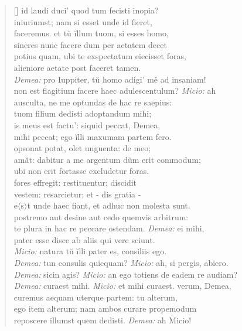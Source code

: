 \begin{verse}[\versewidth]
    id laudi duci' quod tum fecisti inopia?\\
    iniuriumst; nam si esset unde id fieret,\\
    faceremus. et tŭ ĭllum tuom, si esses homo,\\
    sineres nunc facere dum per aetatem decet\\
    potius quam, ubi te exspectatum eiecisset foras,\\
    alieniore aetate post faceret tamen.\\
    \textit{Demea:} pro Iuppiter, tŭ homo adigi' mě ad insaniam!\\
    non est flagitium facere haec adulescentulum? \textit{Micio:} ah\\
    ausculta, ne me optundas de hac re saepius:\\
    tuom filium dedisti adoptandum mihi;\\
    is meus est factu': siquid peccat, Demea,\\
    mihi peccat; ego ĭlli maxumam partem fero.\\
    opsonat potat, olet unguenta: de meo;\\
    amăt: dabitur a me argentum dŭm erit commodum;\\
    ubi non erit fortasse excludetur foras.\\
    fores effregit: restituentur; discidit\\
    vestem: resarcietur; et - dis gratia -\\
    e$\langle$s$\rangle$t unde haec fiant, et adhuc non molesta sunt.\\
    postremo aut desine aut cedo quemvis arbitrum:\\
    te plura in hac re peccare ostendam. \textit{Demea:} ei mihi,\\
    pater esse disce ab aliis qui vere sciunt.\\
    \textit{Micio:} natura tŭ ĭlli pater es, consiliis ego.\\
    \textit{Demea:} tun consulis quicquam? \textit{Micio:} ah, si pergis, abiero.\\
    \textit{Demea:} sicin agis? \textit{Micio:} an ego totiens de eadem re audiam?\\
    \textit{Demea:} curaest mihi. \textit{Micio:} et mihi curaest. verum, Demea,\\
    curemus aequam uterque partem: tu alterum,\\
    ego item alterum; nam ambos curare propemodum\\
    reposcere illumst quem dedisti. \textit{Demea:} ah Micio!\\

\end{verse}
